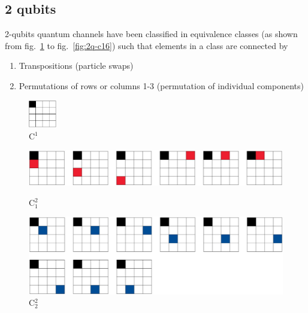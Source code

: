 \documentclass[11pt,dvipsnames]{article} %
\newcommand{\fref}[1]{fig.~\ref{#1}}  \newcommand{\tref}[1]{table~\ref{#1}}
\newcommand{\1}{\mathds{1}}
\begin{document}
\subsection*{2 qubits} %
2-qubits quantum channels have been classified in equivalence classes 
(as shown from \fref{fig:2q-c1} to \fref{fig:2q-c16}) such
that elements in a class are connected by
\begin{enumerate}
	\item Transpositions (particle swaps)
	\item Permutations of rows or columns 1-3 (permutation of individual 
	components) 
\end{enumerate}

\begin{figure}[H] %
	\centering
  \includegraphics[height=1.2cm]
	{img/C16.png}
	\caption{C${}^{1}$}
	\label{fig:2q-c1}
\end{figure} %

\begin{figure}[H] %
	\begin{minipage}[c]{0.5\textwidth}
		\centering
	  \includegraphics[width=.9\textwidth]
		{img/C12.png}
		\vspace{1.2cm}
		\caption{C${}_1^2$}
	\end{minipage}\hfill
	\begin{minipage}[c]{0.5\textwidth}
		\centering
	  \includegraphics[width=.9\textwidth]
		{img/C22.png}
		\caption{C${}_2^2$}
	\end{minipage}
\end{figure} %
\end{document}
